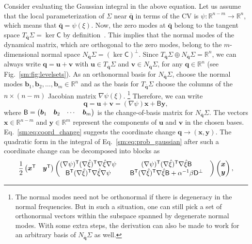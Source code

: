 Consider evaluating the Gaussian integral in the above equation.
Let us assume that the local parameterization of $\Sigma$ near $\bar{\bm{q}}$ in terms of the CV is $\psi: \mathbb{R}^{n-m} \to \mathbb{R}^n$, which means that $\bar{\bm{q}} = \psi(\xi)$.
Now, the zero modes at $\bar{\bm{q}}$ belong to the tangent space $T_{\bar{\bm{q}}}\Sigma = \ker \mathsf{C}$ by definition~\cite{leimkuhler2005}.
This implies that the normal modes of the dynamical matrix, which are orthogonal to the zero modes, belong to the $m$-dimensional normal space $N_{\bar{\bm{q}}}\Sigma = (\ker\mathsf{C})^\perp$.
Since $T_{\bar{\bm{q}}}\Sigma \oplus N_{\bar{\bm{q}}}\Sigma = \mathbb{R}^n$, we can always write $\bm{q} = \bm{u} + \bm{v}$ with
$\bm{\bm{u}} \in T_{\bar{\bm{q}}}\Sigma$ and $\bm{v} \in N_{\bar{\bm{q}}}\Sigma$, for any $\bm{q} \in \mathbb{R}^n$ (see Fig.~\ref{sm:fig:levelsets}).
As an orthonormal basis for $N_{\bar{\bm{q}}}\Sigma$, choose the normal modes $\bm{b}_1, \bm{b}_2, \ldots, \bm{b}_m \in \mathbb{R}^n$ and as the basis for $T_{\bar{\bm{q}}}\Sigma$ choose the columns of the $n\times(n-m)$ Jacobian matrix $\nabla\psi(\xi)$.%
\footnote{The normal modes need not be orthonormal if there is degeneracy in the normal frequencies.
But in such a situation, one can still pick a set of orthonormal vectors within the subspace spanned by degenerate normal modes.
With some extra steps, the derivation can also be made to work for an arbitrary basis of $N_{\bar{\bm{q}}}\Sigma$ as well.}
Therefore, we can write
%
\begin{equation}
  \bm{q} = \bm{u} + \bm{v} = (\nabla\psi)\bm{x} + \mathsf{B}\bm{y},
  \label{sm:eq:coord_change}
\end{equation}
%
where $\mathsf{B}  = \begin{pmatrix}\bm{b}_1 & \bm{b}_2 & \cdots & \bm{b}_m\end{pmatrix}$ is the change-of-basis matrix for $N_{\bar{\bm{q}}}\Sigma$.
The vectors $\bm{x} \in \mathbb{R}^{n-m}$ and $\bm{y} \in \mathbb{R}^m$ represent the components of $\bm{u}$ and $\bm{v}$ in the chosen bases.
Eq.~\eqref{sm:eq:coord_change} suggests the coordinate change $\bm{q} \to (\bm{x}, \bm{y})$.
The quadratic form in the integral of Eq.~\eqref{sm:eq:prob_gaussian} after such a coordinate change can be decomposed into blocks as
%
\begin{equation}
  \frac{1}{2}
  \begin{pmatrix}
    \bm{x}^\mathsf{T} & \bm{y}^\mathsf{T}
  \end{pmatrix}
  \begin{pmatrix}
    (\nabla\psi)^\mathsf{T}(\nabla\hat{\xi})^\mathsf{T}\nabla{\hat{\xi}}\nabla\psi &
    \quad(\nabla\psi)^\mathsf{T}(\nabla\hat{\xi})^\mathsf{T}\nabla\hat{\xi}\mathsf{B} \\
    \mathsf{B}^\mathsf{T}(\nabla\hat{\xi})^\mathsf{T}\nabla{\hat{\xi}}\nabla\psi &
    \quad\mathsf{B}^\mathsf{T}(\nabla\hat{\xi})^\mathsf{T}\nabla\hat{\xi}\mathsf{B} + \alpha^{-1}\beta\mathsf{D}^\perp &
  \end{pmatrix}
  \begin{pmatrix}
    \bm{x}\\
    \bm{y}
  \end{pmatrix},
  \label{sm:eq:quadratic_form}
\end{equation}
